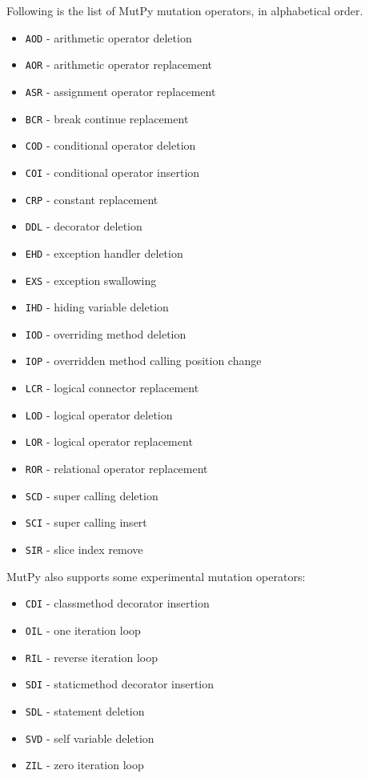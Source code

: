 \documentclass[12pt]{article}
\begin{document}
Following is the list of MutPy mutation operators, in alphabetical order.

\begin{itemize}
  \itemsep0em 
  \item \texttt{AOD} - arithmetic operator deletion
  \item \texttt{AOR} - arithmetic operator replacement
  \item \texttt{ASR} - assignment operator replacement
  \item \texttt{BCR} - break continue replacement
  \item \texttt{COD} - conditional operator deletion
  \item \texttt{COI} - conditional operator insertion
  \item \texttt{CRP} - constant replacement
  \item \texttt{DDL} - decorator deletion
  \item \texttt{EHD} - exception handler deletion
  \item \texttt{EXS} - exception swallowing
  \item \texttt{IHD} - hiding variable deletion
  \item \texttt{IOD} - overriding method deletion
  \item \texttt{IOP} - overridden method calling position change
  \item \texttt{LCR} - logical connector replacement
  \item \texttt{LOD} - logical operator deletion
  \item \texttt{LOR} - logical operator replacement
  \item \texttt{ROR} - relational operator replacement
  \item \texttt{SCD} - super calling deletion
  \item \texttt{SCI} - super calling insert
  \item \texttt{SIR} - slice index remove
\end{itemize}

MutPy also supports some experimental mutation operators:

\begin{itemize}
  \itemsep0em 
  \item \texttt{CDI} - classmethod decorator insertion
  \item \texttt{OIL} - one iteration loop
  \item \texttt{RIL} - reverse iteration loop
  \item \texttt{SDI} - staticmethod decorator insertion
  \item \texttt{SDL} - statement deletion
  \item \texttt{SVD} - self variable deletion
  \item \texttt{ZIL} - zero iteration loop
\end{itemize}
\end{document}
